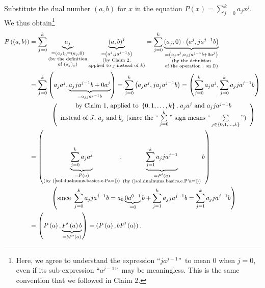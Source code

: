 \documentclass[paper=a4, fontsize=12pt]{scrartcl}%
\let\sumnonlimits\sum
\renewcommand{\sum}{\sumnonlimits\limits}
\theoremstyle{plainsl}
\theoremstyle{definition}
\theoremstyle{remark}
\begin{document}
Substitute the dual number $\left(  a,b\right)  $ for $x$ in the equation
$P\left(  x\right)  =\sum_{j=0}^{k}a_{j}x^{j}$. We thus obtain\footnote{Here,
we agree to understand the expression \textquotedblleft$ja^{j-1}%
$\textquotedblright\ to mean $0$ when $j=0$, even if its sub-expression
\textquotedblleft$a^{j-1}$\textquotedblright\ may be meaningless. This is the
same convention that we followed in Claim 2.}%
\begin{align*}
P\left(  \left(  a,b\right)  \right)   &  =\sum_{j=0}^{k}\underbrace{a_{j}%
}_{\substack{=\left(  a_{j}\right)  _{\mathbb{D}}=\left(  a_{j},0\right)
\\\text{(by the definition}\\\text{of }\left(  a_{j}\right)  _{\mathbb{D}%
}\text{)}}}\underbrace{\left(  a,b\right)  ^{j}}_{\substack{=\left(
a^{j},ja^{j-1}b\right)  \\\text{(by Claim 2,}\\\text{applied to }j\text{
instead of }k\text{)}}}=\sum_{j=0}^{k}\underbrace{\left(  a_{j},0\right)
\cdot\left(  a^{j},ja^{j-1}b\right)  }_{\substack{=\left(  a_{j}a^{j}%
,a_{j}ja^{j-1}b+0a^{j}\right)  \\\text{(by the definition}\\\text{of the
operation }\cdot\text{ on }\mathbb{D}\text{)}}}\\
&  =\sum_{j=0}^{k}\left(  a_{j}a^{j},\underbrace{a_{j}ja^{j-1}b+0a^{j}%
}_{=a_{j}ja^{j-1}b}\right)  =\sum_{j=0}^{k}\left(  a_{j}a^{j},ja_{j}%
a^{j-1}b\right)  =\left(  \sum_{j=0}^{k}a_{j}a^{j},\sum_{j=0}^{k}a_{j}%
ja^{j-1}b\right) \\
&  \ \ \ \ \ \ \ \ \ \ \left(
\begin{array}
[c]{c}%
\text{by Claim 1, applied to }\left\{  0,1,\ldots,k\right\}  \text{, }%
a_{j}a^{j}\text{ and }a_{j}ja^{j-1}b\\
\text{instead of }J\text{, }a_{j}\text{ and }b_{j}\text{ (since the
\textquotedblleft}\sum_{j=0}^{k}\text{\textquotedblright\ sign means
\textquotedblleft}\sum_{j\in\left\{  0,1,\ldots,k\right\}  }%
\text{\textquotedblright)}%
\end{array}
\right) \\
&  =\left(  \underbrace{\sum_{j=0}^{k}a_{j}a^{j}}_{\substack{=P\left(
a\right)  \\\text{(by (\ref{sol.dualnums.basics.e.Pa=}))}}},\underbrace{\sum
_{j=1}^{k}a_{j}ja^{j-1}}_{\substack{=P^{\prime}\left(  a\right)  \\\text{(by
(\ref{sol.dualnums.basics.e.P'a=}))}}}b\right) \\
&  \ \ \ \ \ \ \ \ \ \ \left(  \text{since }\sum_{j=0}^{k}a_{j}ja^{j-1}%
b=a_{0}\underbrace{0a^{0-1}}_{=0}b+\sum_{j=1}^{k}a_{j}ja^{j-1}b=\sum_{j=1}%
^{k}a_{j}ja^{j-1}b\right) \\
&  =\left(  P\left(  a\right)  ,\underbrace{P^{\prime}\left(  a\right)
b}_{=bP^{\prime}\left(  a\right)  }\right)  =\left(  P\left(  a\right)
,bP^{\prime}\left(  a\right)  \right)  .
\end{align*}
\end{document}
